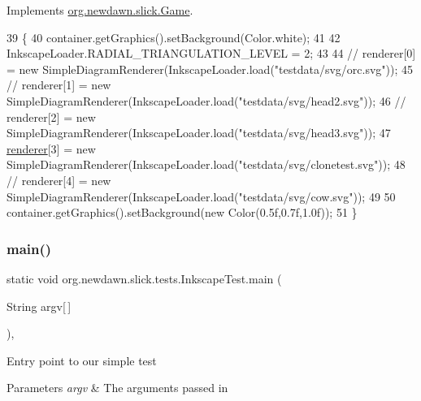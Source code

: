 Implements \mbox{\hyperlink{interfaceorg_1_1newdawn_1_1slick_1_1_game_ad2dd6affab08bb8fdb5fab0815957b7a}{org.\+newdawn.\+slick.\+Game}}.


\begin{DoxyCode}
39                                                                     \{
40         container.getGraphics().setBackground(Color.white);
41         
42         InkscapeLoader.RADIAL\_TRIANGULATION\_LEVEL = 2;
43         
44 \textcolor{comment}{//      renderer[0] = new SimpleDiagramRenderer(InkscapeLoader.load("testdata/svg/orc.svg"));}
45 \textcolor{comment}{//      renderer[1] = new SimpleDiagramRenderer(InkscapeLoader.load("testdata/svg/head2.svg"));}
46 \textcolor{comment}{//      renderer[2] = new SimpleDiagramRenderer(InkscapeLoader.load("testdata/svg/head3.svg"));}
47         \mbox{\hyperlink{classorg_1_1newdawn_1_1slick_1_1tests_1_1_inkscape_test_ad55f8a6c6ee8f9f5b708e61240e4ce9a}{renderer}}[3] = \textcolor{keyword}{new} SimpleDiagramRenderer(InkscapeLoader.load(\textcolor{stringliteral}{"testdata/svg/clonetest.svg"}));
48 \textcolor{comment}{//      renderer[4] = new SimpleDiagramRenderer(InkscapeLoader.load("testdata/svg/cow.svg"));}
49         
50         container.getGraphics().setBackground(\textcolor{keyword}{new} Color(0.5f,0.7f,1.0f));
51     \}
\end{DoxyCode}
\mbox{\label{classorg_1_1newdawn_1_1slick_1_1tests_1_1_inkscape_test_a3a2111e00dd3ca25c44e087984e5fece}} 
\subsubsection{\texorpdfstring{main()}{main()}}
{\footnotesize\ttfamily static void org.\+newdawn.\+slick.\+tests.\+Inkscape\+Test.\+main (\begin{DoxyParamCaption}\item[{String}]{argv\mbox{[}$\,$\mbox{]} }\end{DoxyParamCaption})\hspace{0.3cm}{\ttfamily [inline]}, {\ttfamily [static]}}

Entry point to our simple test


\begin{DoxyParams}{Parameters}
{\em argv} & The arguments passed in \\
\hline
\end{DoxyParams}

